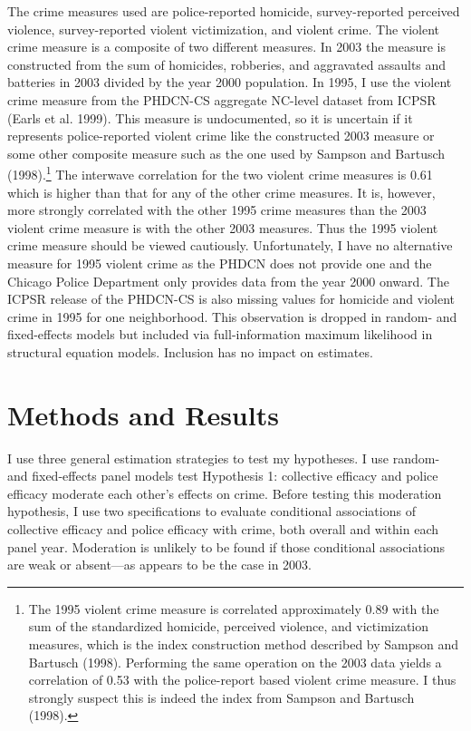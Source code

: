 \documentclass [11pt, proquest] {uwthesis}[2015/03/03]
\begin{document}
The crime measures used are police-reported homicide, survey-reported perceived violence, survey-reported violent victimization, and violent crime. The violent crime measure is a composite of two different measures. In 2003 the measure is constructed from the sum of homicides, robberies, and aggravated assaults and batteries in 2003 divided by the year 2000 population. In 1995, I use the violent crime measure from the PHDCN-CS aggregate NC-level dataset from ICPSR (Earls et al. 1999). This measure is undocumented, so it is uncertain if it represents police-reported violent crime like the constructed 2003 measure or some other composite measure such as the one used by Sampson and Bartusch (1998).\footnote{The 1995 violent crime measure is correlated approximately 0.89 with the sum of the standardized homicide, perceived violence, and victimization measures, which is the index construction method described by Sampson and Bartusch (1998). Performing the same operation on the 2003 data yields a correlation of 0.53 with the police-report based violent crime measure. I thus strongly suspect this is indeed the index from Sampson and Bartusch (1998).} The interwave correlation for the two violent crime measures is 0.61 which is higher than that for any of the other crime measures. It is, however, more strongly correlated with the other 1995 crime measures than the 2003 violent crime measure is with the other 2003 measures. Thus the 1995 violent crime measure should be viewed cautiously. Unfortunately, I have no alternative measure for 1995 violent crime as the PHDCN does not provide one and the Chicago Police Department only provides data from the year 2000 onward. The ICPSR release of the PHDCN-CS is also missing values for homicide and violent crime in 1995 for one neighborhood. This observation is dropped in random- and fixed-effects models but included via full-information maximum likelihood in structural equation models. Inclusion has no impact on estimates.

\hypertarget{methods-and-results}{%
\section{Methods and Results}\label{methods-and-results}}

I use three general estimation strategies to test my hypotheses. I use random- and fixed-effects panel models test Hypothesis 1: collective efficacy and police efficacy moderate each other's effects on crime. Before testing this moderation hypothesis, I use two specifications to evaluate conditional associations of collective efficacy and police efficacy with crime, both overall and within each panel year. Moderation is unlikely to be found if those conditional associations are weak or absent---as appears to be the case in 2003.
\end{document}
